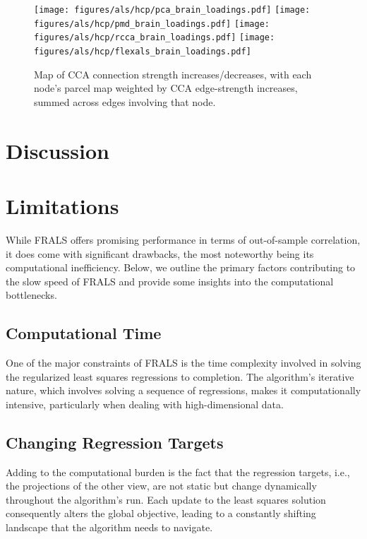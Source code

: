 \begin{figure}[h]
\centering
\texttt{[image: figures/als/hcp/pca\_brain\_loadings.pdf]}
\texttt{[image: figures/als/hcp/pmd\_brain\_loadings.pdf]}
\texttt{[image: figures/als/hcp/rcca\_brain\_loadings.pdf]}
\texttt{[image: figures/als/hcp/flexals\_brain\_loadings.pdf]}
\caption*{Map of CCA connection strength increases/decreases, with each node’s parcel map weighted by CCA edge-strength increases, summed across edges involving that node.}
\label{fig:brain}
\end{figure}

\section{Discussion}


\section{Limitations}\label{sec:limitations}

While FRALS offers promising performance in terms of out-of-sample correlation, it does come with significant drawbacks, the most noteworthy being its computational inefficiency. Below, we outline the primary factors contributing to the slow speed of FRALS and provide some insights into the computational bottlenecks.

\subsection{Computational Time}\label{subsec:computational-time}
One of the major constraints of FRALS is the time complexity involved in solving the regularized least squares regressions to completion. The algorithm’s iterative nature, which involves solving a sequence of regressions, makes it computationally intensive, particularly when dealing with high-dimensional data.

\subsection{Changing Regression Targets}\label{subsec:changing-regression-targets}
Adding to the computational burden is the fact that the regression targets, i.e., the projections of the other view, are not static but change dynamically throughout the algorithm's run.
Each update to the least squares solution consequently alters the global objective, leading to a constantly shifting landscape that the algorithm needs to navigate.





